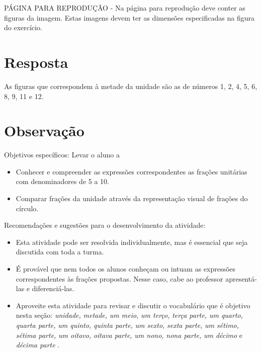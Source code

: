 \documentclass{book}
\begin{document}
  
  \begin{imagem*}[breakable]{}{}         
    \begin{nota*}[breakable]{}{}       PÁGINA PARA REPRODUÇÃO - Na página para reprodução deve conter as figuras da imagem. Estas imagens devem ter as dimensões especificadas na figura do exercício.      
    \end{nota*}    
  \end{imagem*}  



\section{Resposta}  
  As figuras que correspondem à metade da unidade são as de números 1, 2, 4, 5, 6, 8, 9, 11 e 12.  




\section{Observação}     
  Objetivos específicos: Levar o aluno a   
\begin{itemize} %
    \item       Conhecer e compreender as expressões correspondentes as frações unitárias com denominadores de 5 a 10.
    \item       Comparar frações da unidade através da representação visual de frações do círculo.
\end{itemize} %
  
      
  Recomendações e sugestões para o desenvolvimento da atividade:  
\begin{itemize} %
    \item       Esta atividade pode ser resolvida individualmente, mas é essencial que seja discutida com toda a turma.  
    \item       É provável que nem todos os alunos conheçam ou intuam as expressões correspondentes às frações propostas. Nesse caso, cabe ao professor apresentá-las e diferenciá-las.
    \item       Aproveite esta atividade para revisar e discutir o vocabulário que é objetivo nesta seção:       {\it unidade,}             {\it metade,}             {\it um meio,}             {\it um terço,}             {\it terça parte,}             {\it um quarto,}             {\it quarta parte,}             {\it um quinto,}             {\it quinta parte,}             {\it um sexto,}             {\it sexta parte,}             {\it um sétimo,}             {\it sétima parte,}             {\it um oitavo,}             {\it oitava parte,}             {\it um nono,}             {\it nona parte,}             {\it um décimo}       e       {\it décima parte}      .
\end{itemize} %
  
\end{document}
